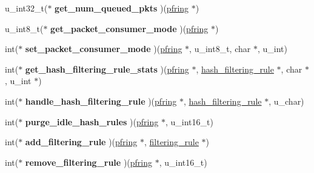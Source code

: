 \begin{DoxyCompactItemize}
\item 
\hypertarget{struct____pfring_ad3f44261b3bfe565dc6439ecd95bdd47}{
u\_\-int32\_\-t($\ast$ {\bfseries get\_\-num\_\-queued\_\-pkts} )(\hyperlink{struct____pfring}{pfring} $\ast$)}
\label{struct____pfring_ad3f44261b3bfe565dc6439ecd95bdd47}

\item 
\hypertarget{struct____pfring_a50fbdb19627b7afe49bc4600c34382ae}{
u\_\-int8\_\-t($\ast$ {\bfseries get\_\-packet\_\-consumer\_\-mode} )(\hyperlink{struct____pfring}{pfring} $\ast$)}
\label{struct____pfring_a50fbdb19627b7afe49bc4600c34382ae}

\item 
\hypertarget{struct____pfring_ae31fcc7b24ec2d4112944238dbd1ecf2}{
int($\ast$ {\bfseries set\_\-packet\_\-consumer\_\-mode} )(\hyperlink{struct____pfring}{pfring} $\ast$, u\_\-int8\_\-t, char $\ast$, u\_\-int)}
\label{struct____pfring_ae31fcc7b24ec2d4112944238dbd1ecf2}

\item 
\hypertarget{struct____pfring_a2171596059e14bffeea149721df8387d}{
int($\ast$ {\bfseries get\_\-hash\_\-filtering\_\-rule\_\-stats} )(\hyperlink{struct____pfring}{pfring} $\ast$, \hyperlink{structhash__filtering__rule}{hash\_\-filtering\_\-rule} $\ast$, char $\ast$, u\_\-int $\ast$)}
\label{struct____pfring_a2171596059e14bffeea149721df8387d}

\item 
\hypertarget{struct____pfring_a2b7f604a90b93790ef0becd53045ed6e}{
int($\ast$ {\bfseries handle\_\-hash\_\-filtering\_\-rule} )(\hyperlink{struct____pfring}{pfring} $\ast$, \hyperlink{structhash__filtering__rule}{hash\_\-filtering\_\-rule} $\ast$, u\_\-char)}
\label{struct____pfring_a2b7f604a90b93790ef0becd53045ed6e}

\item 
\hypertarget{struct____pfring_a63d2e6eb92d11511d5e47c1c8e82d869}{
int($\ast$ {\bfseries purge\_\-idle\_\-hash\_\-rules} )(\hyperlink{struct____pfring}{pfring} $\ast$, u\_\-int16\_\-t)}
\label{struct____pfring_a63d2e6eb92d11511d5e47c1c8e82d869}

\item 
\hypertarget{struct____pfring_ac89dd9b09af90102b90cd3620189be0f}{
int($\ast$ {\bfseries add\_\-filtering\_\-rule} )(\hyperlink{struct____pfring}{pfring} $\ast$, \hyperlink{structfiltering__rule}{filtering\_\-rule} $\ast$)}
\label{struct____pfring_ac89dd9b09af90102b90cd3620189be0f}

\item 
\hypertarget{struct____pfring_ab3bfff81b083efa444afd7b6e9dda75d}{
int($\ast$ {\bfseries remove\_\-filtering\_\-rule} )(\hyperlink{struct____pfring}{pfring} $\ast$, u\_\-int16\_\-t)}
\label{struct____pfring_ab3bfff81b083efa444afd7b6e9dda75d}


\end{DoxyCompactItemize}
